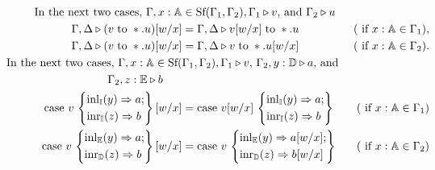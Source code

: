 \begin{definition}
\begin{align*}
  \hspace{-23pt}\text{In the next two cases, }\Gamma,x: \mathbb{A} &  \in \text{Sf}(\Gamma_1,\Gamma_2), \Gamma_1 \triangleright v \text{, and } \Gamma_2 \triangleright u  \\
  \hspace{-23pt}\Gamma, \Delta  \triangleright(v \hspace{3 pt} \text{to} \hspace{3 pt} *.u)[w/x] &= \Gamma, \Delta  \triangleright v[w/x] \hspace{3 pt} \text{to} \hspace{3 pt} *.u&  (\text{ if } x: \mathbb{A} \in \Gamma_1),\\
  \hspace{-23pt}\Gamma, \Delta  \triangleright(v \hspace{3 pt} \text{to} \hspace{3 pt} *.u)[w/x] &= \Gamma, \Delta  \triangleright v \hspace{3 pt} \text{to} \hspace{3 pt} *.u[w/x] &  (\text{ if } x: \mathbb{A} \in \Gamma_2).\\
  \hspace{-23pt}\text{In the next two cases, }\Gamma,x: \mathbb{A}  \in \text{Sf}(&\Gamma_1,\Gamma_2), \Gamma_1 \triangleright v \text{, } \Gamma_2, y: \mathbb{D}\triangleright a   \text{, and } \\
   & \hspace{-66pt} \Gamma_2, z: \mathbb{E}\triangleright b  \\
   \hspace{-23pt} \text{case } v \,  
  \left\{
    \begin{aligned} 
    &\inl_{\typeI}(y) \Rightarrow a; \\
    &\inr_{\typeI}(z) \Rightarrow  b  \\ 
  \end{aligned}  
  \right\}[w/x] &=  \text{case } v [w/x]  \,  
  \left\{
    \begin{aligned} 
    &\inl_{\typeI}(y) \Rightarrow a; \\
    &\inr_{\typeI}(z) \Rightarrow  b  \\ 
  \end{aligned}  
  \right\}  &  (\text{ if } x: \mathbb{A} \in \Gamma_1) \\
  \text{case } v \,  
  \left\{
    \begin{aligned} 
    &\inl_{\typeE}(y) \Rightarrow a; \\
    &\inr_{\typeD}(z) \Rightarrow  b  \\ 
  \end{aligned}  
  \right\}[w/x] &=  \text{case } v   \,  
  \left\{
    \begin{aligned} 
    &\inl_{\typeE}(y) \Rightarrow a [w/x]; \\
    &\inr_{\typeD}(z) \Rightarrow  b [w/x]  \\ 
  \end{aligned}  
  \right\}  &  (\text{ if } x: \mathbb{A} \in \Gamma_2) \\
\end{align*}
\end{definition}




